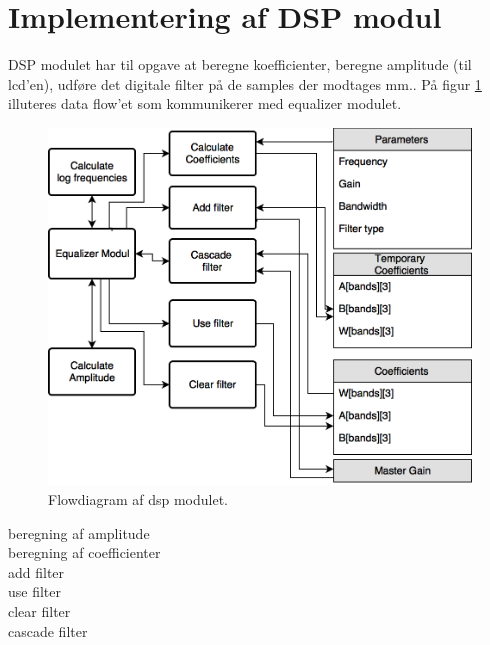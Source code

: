 \section{Implementering af DSP modul}\label{sec:implementering_dsp}
DSP modulet har til opgave at beregne koefficienter, beregne amplitude (til lcd'en), udføre det 
digitale filter på de samples der modtages mm.. På figur \ref{fig:dsp_flow_diag} illuteres data flow'et 
som kommunikerer med equalizer modulet.

\begin{figure}[h]
\centering
\includegraphics[scale = 0.3]{billeder/dsp_flowdiagram}
\caption{Flowdiagram af dsp modulet.}
\label{fig:dsp_flow_diag}
\end{figure}


beregning af amplitude \\
beregning af coefficienter\\
add filter \\
use filter \\
clear filter \\
cascade filter \\
